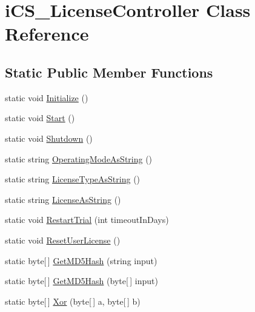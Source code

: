 \hypertarget{classi_c_s___license_controller}{\section{i\+C\+S\+\_\+\+License\+Controller Class Reference}
\label{classi_c_s___license_controller}
}
\subsection*{Static Public Member Functions}
\begin{DoxyCompactItemize}
\item 
static void \hyperlink{classi_c_s___license_controller_aa0db04722241d2fd8cd287837842b48c}{Initialize} ()
\item 
static void \hyperlink{classi_c_s___license_controller_ad042daf78187b2e13e74a2361539fba4}{Start} ()
\item 
static void \hyperlink{classi_c_s___license_controller_a7b454128c7ad912384ef2e8bdc5d4c02}{Shutdown} ()
\item 
static string \hyperlink{classi_c_s___license_controller_ac359c72ad4e0377806ebb9034cae12ae}{Operating\+Mode\+As\+String} ()
\item 
static string \hyperlink{classi_c_s___license_controller_a9663f929b7e2d8254da918e7e3697337}{License\+Type\+As\+String} ()
\item 
static string \hyperlink{classi_c_s___license_controller_a3062d02c5866cc83e1d6f6d170e2d511}{License\+As\+String} ()
\item 
static void \hyperlink{classi_c_s___license_controller_abbe733d0e54337573a6ea86345df0c13}{Restart\+Trial} (int timeout\+In\+Days)
\item 
static void \hyperlink{classi_c_s___license_controller_a348edfada597c87f764de05073f68b00}{Reset\+User\+License} ()
\item 
static byte\mbox{[}$\,$\mbox{]} \hyperlink{classi_c_s___license_controller_a094268d79cf88dd52ffb4361388fc142}{Get\+M\+D5\+Hash} (string input)
\item 
static byte\mbox{[}$\,$\mbox{]} \hyperlink{classi_c_s___license_controller_a3fb2375152a0951f101dd7b369726afc}{Get\+M\+D5\+Hash} (byte\mbox{[}$\,$\mbox{]} input)
\item 
static byte\mbox{[}$\,$\mbox{]} \hyperlink{classi_c_s___license_controller_a6529b97e36d678ce9cac6b55afd0d84e}{Xor} (byte\mbox{[}$\,$\mbox{]} a, byte\mbox{[}$\,$\mbox{]} b)
\item 

\end{DoxyCompactItemize}
